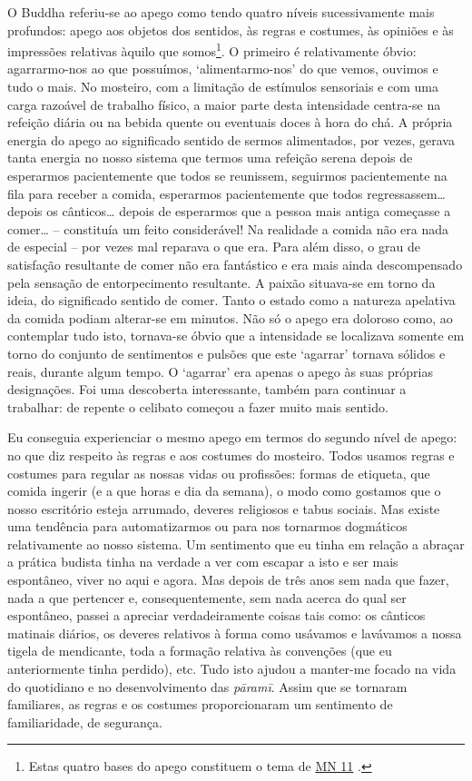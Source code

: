 O Buddha referiu-se ao apego como tendo quatro níveis sucessivamente mais profundos: apego aos objetos dos sentidos, às regras e costumes, às opiniões e às impressões relativas àquilo que somos\footnote{Estas quatro bases do apego constituem o tema de \href{https://suttacentral.net/mn11/en/bodhi}{MN 11} .}. O primeiro é relativamente óbvio: agarrarmo-nos ao que possuímos, `alimentarmo-nos' do que vemos, ouvimos e tudo o mais. No mosteiro, com a limitação de estímulos sensoriais e com uma carga razoável de trabalho físico, a maior parte desta intensidade centra-se na refeição diária ou na bebida quente ou eventuais doces à hora do chá. A própria energia do apego ao significado sentido de sermos alimentados, por vezes, gerava tanta energia no nosso sistema que termos uma refeição serena depois de esperarmos pacientemente que todos se reunissem, seguirmos pacientemente na fila para receber a comida, esperarmos pacientemente que todos regressassem\ldots{} depois os cânticos\ldots{} depois de esperarmos que a pessoa mais antiga começasse a comer\ldots{} -- constituía um feito considerável! Na realidade a comida não era nada de especial -- por vezes mal reparava o que era. Para além disso, o grau de satisfação resultante de comer não era fantástico e era mais ainda descompensado pela sensação de entorpecimento resultante. A paixão situava-se em torno da ideia, do significado sentido de comer. Tanto o estado como a natureza apelativa da comida podiam alterar-se em minutos. Não só o apego era doloroso como, ao contemplar tudo isto, tornava-se óbvio que a intensidade se localizava somente em torno do conjunto de sentimentos e pulsões que este `agarrar' tornava sólidos e reais, durante algum tempo. O `agarrar' era apenas o apego às suas próprias designações. Foi uma descoberta interessante, também para continuar a trabalhar: de repente o celibato começou a fazer muito mais sentido.

Eu conseguia experienciar o mesmo apego em termos do segundo nível de apego: no que diz respeito às regras e aos costumes do mosteiro. Todos usamos regras e costumes para regular as nossas vidas ou profissões: formas de etiqueta, que comida ingerir (e a que horas e dia da semana), o modo como gostamos que o nosso escritório esteja arrumado, deveres religiosos e tabus sociais. Mas existe uma tendência para automatizarmos ou para nos tornarmos dogmáticos relativamente ao nosso sistema. Um sentimento que eu tinha em relação a abraçar a prática budista tinha na verdade a ver com escapar a isto e ser mais espontâneo, viver no aqui e agora. Mas depois de três anos sem nada que fazer, nada a que pertencer e, consequentemente, sem nada acerca do qual ser espontâneo, passei a apreciar verdadeiramente coisas tais como: os cânticos matinais diários, os deveres relativos à forma como usávamos e lavávamos a nossa tigela de mendicante, toda a formação relativa às convenções (que eu anteriormente tinha perdido), etc. Tudo isto ajudou a manter-me focado na vida do quotidiano e no desenvolvimento das \emph{pāramī}. Assim que se tornaram familiares, as regras e os costumes proporcionaram um sentimento de familiaridade, de segurança.

